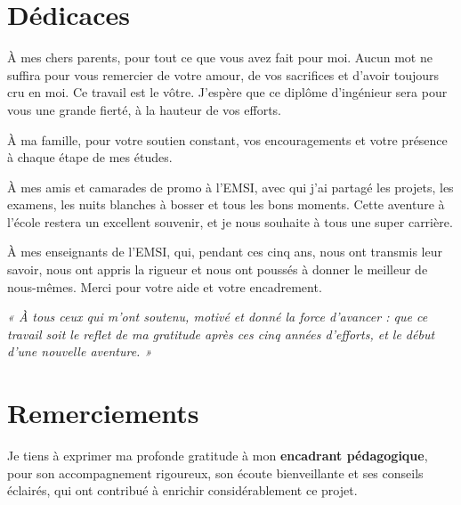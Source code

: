 \documentclass[12pt,a4paper,oneside]{report}
\begin{document}
\chapter*{Dédicaces}

\begin{center}
\itshape

À mes chers parents, pour tout ce que vous avez fait pour moi. Aucun mot ne suffira pour vous remercier de votre amour, de vos sacrifices et d'avoir toujours cru en moi. Ce travail est le vôtre. J'espère que ce diplôme d'ingénieur sera pour vous une grande fierté, à la hauteur de vos efforts.

\vspace{0.5cm}
À ma famille, pour votre soutien constant, vos encouragements et votre présence à chaque étape de mes études.

\vspace{0.5cm}
À mes amis et camarades de promo à l'EMSI, avec qui j'ai partagé les projets, les examens, les nuits blanches à bosser et tous les bons moments. Cette aventure à l'école restera un excellent souvenir, et je nous souhaite à tous une super carrière.

\vspace{0.5cm}
À mes enseignants de l'EMSI, qui, pendant ces cinq ans, nous ont transmis leur savoir, nous ont appris la rigueur et nous ont poussés à donner le meilleur de nous-mêmes. Merci pour votre aide et votre encadrement.

\vspace{1cm}
\textit{« À tous ceux qui m'ont soutenu, motivé et donné la force d'avancer : que ce travail soit le reflet de ma gratitude après ces cinq années d'efforts, et le début d'une nouvelle aventure. »}
\end{center}

\chapter*{Remerciements}

Je tiens à exprimer ma profonde gratitude à mon \textbf{encadrant pédagogique}, pour son accompagnement rigoureux, son écoute bienveillante et ses conseils éclairés, qui ont contribué à enrichir considérablement ce projet.
\end{document}
